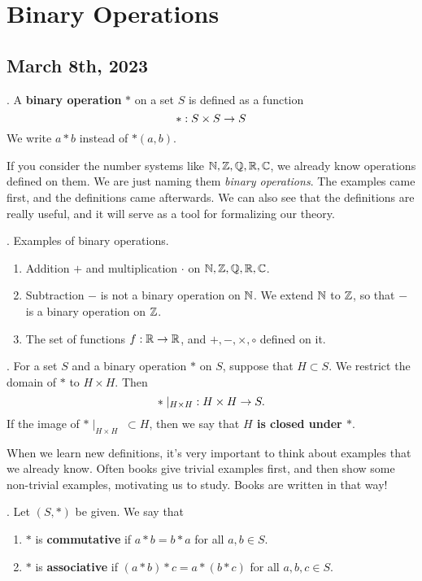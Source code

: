 \chapter{Binary Operations}

\section*{March 8th, 2023}

.  A \textbf{binary operation} \(*\) on a set \(S\) is defined as a function
\[
    *: S \times S \rightarrow S
\]
We write \(a * b\) instead of \(*(a, b)\).

\rmk If you consider the number systems like \(\mathbb{N}, \mathbb{Z}, \mathbb{Q}, \mathbb{R}, \mathbb{C}\), we already know operations defined on them. We are just naming them \textit{binary operations}. The examples came first, and the definitions came afterwards. We can also see that the definitions are really useful, and it will serve as a tool for formalizing our theory.

\ex. Examples of binary operations.
\begin{enumerate}
    \item Addition \(+\) and multiplication \(\cdot\) on \(\mathbb{N}, \mathbb{Z}, \mathbb{Q}, \mathbb{R}, \mathbb{C}\).
    \item Subtraction \(-\) is not a binary operation on \(\mathbb{N}\). We extend \(\mathbb{N}\) to \(\mathbb{Z}\), so that \(-\) is a binary operation on \(\mathbb{Z}\).
    \item The set of functions \(f: \mathbb{R} \rightarrow \mathbb{R}\), and \(+, -, \times, \circ\) defined on it.
\end{enumerate}

.  For a set \(S\) and a binary operation \(*\) on \(S\), suppose that \(H \subset S\). We restrict the domain of \(*\) to \(H \times H\). Then
\[
    *\mid_{H\times H} \;: H\times H \rightarrow S.
\]
If the image of \(*\mid_{H\times H} \;\subset H\), then we say that \textbf{\(H\) is closed under \(*\)}.

\rmk When we learn new definitions, it's very important to think about examples that we already know. Often books give trivial examples first, and then show some non-trivial examples, motivating us to study. Books are written in that way!

. Let \((S, *)\) be given. We say that
\begin{enumerate}
    \item \(*\) is \textbf{commutative} if \(a * b = b * a\) for all \(a, b \in S\).
    \item \(*\) is \textbf{associative} if \((a * b)* c = a * (b * c)\) for all \(a, b, c \in S\).
\end{enumerate}

